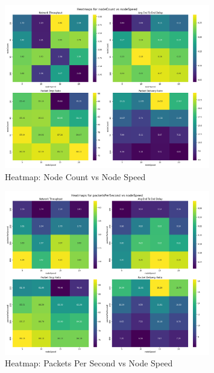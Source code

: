 \documentclass{article}
\begin{document}
\begin{figure}[h]
\centering
\includegraphics[width=0.8\textwidth]{plots/task-1/two-params-heatmaps/heatmap_nodeCount_nodeSpeed}
\caption{Heatmap: Node Count vs Node Speed}
\end{figure}

\begin{figure}[h]
\centering
\includegraphics[width=0.8\textwidth]{plots/task-1/two-params-heatmaps/heatmap_packetsPerSecond_nodeSpeed}
\caption{Heatmap: Packets Per Second vs Node Speed}
\end{figure}
\end{document}
